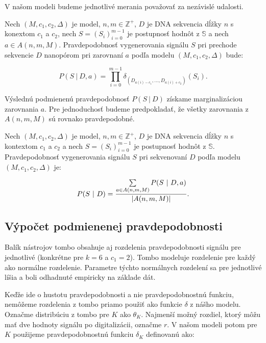 V našom modeli budeme jednotlivé merania považovať za nezávislé udalosti.

\begin{definicia}

Nech $(M, c_1, c_2, \Delta)$ je  model, $n, m \in \mathbb{Z}^+$, $D$ je DNA sekvencia dĺžky $n$ s konextom
$c_1$ a $c_2$, nech $S = (S_i)_{i=0}^{m-1}$ je postupnosť hodnôt z $\mathbb{S}$ a nech 
$a \in A(n, m, M)$. Pravdepodobnosť vygenerovania signálu $S$ pri prechode sekvencie $D$ nanopórom
pri zarovnaní $a$ podľa modelu $(M, c_1, c_2, \Delta)$ bude:

$$P(S ~|~ D, a) = \prod\limits_{i=0}^{m-1} \delta_{(D_{a(i)-c_1}, \dots, D_{a(i)+c_2})}(S_i) \text{.}$$

\end{definicia}

Výslednú podmienenú pravdepodobnosť $P(S ~|~ D)$ získame marginalizáciou zarovnania $a$.
 Pre jednoduchosť budeme predpokladať, že všetky zarovnania z $A(n, m, M)$ sú rovnako pravdepodobné.

\begin{definicia}

Nech $(M, c_1, c_2, \Delta)$ je  model, $n, m \in \mathbb{Z}^+$, $D$ je DNA sekvencia dĺžky $n$ s kontextom $c_1$ a $c_2$ a nech $S = (S_i)_{i=0}^{m-1}$ je postupnosť hodnôt z $\mathbb{S}$.
Pravdepodobnosť vygenerovania signálu $S$ pri sekvenovaní $D$ podľa modelu $(M, c_1, c_2, \Delta)$ je:

$$P(S ~|~ D) =  \frac{\sum\limits_{a \in A(n, m, M)} P(S ~|~ D, a)}{\abs*{A(n, m, M)}} \text{.}$$
\end{definicia}



\subsection{Výpočet podmienenej pravdepodobnosti}
\label{sec:dtw}

Balík nástrojov tombo obsahuje aj rozdelenia pravdepodobnosti signálu pre jednotlivé  (konkrétne pre $k=6$ a
$c_1 = 2$). Tombo modeluje rozdelenie pre každý \kmer{} ako normálne rozdelenie. Parametre týchto normálnych rozdelení
sa pre jednotlivé  líšia a boli odhadnuté empiricky na základe dát. 

Keďže ide o hustotu pravdepodobnosti a nie pravdepodobnostnú funkciu, nemôžeme rozdelenia z tombo priamo použiť
ako funkcie $\delta$ z nášho modelu. Označme distribúciu z tombo pre \kmer{} $K$ ako $\theta_K$. Najmenší možný rozdiel,
ktorý môžu mať dve hodnoty signálu po digitalizácii, označme $r$. V našom modeli potom pre \kmer{} $K$ použijeme
pravdepodobnostnú funkciu $\delta_K$ definovanú ako:

